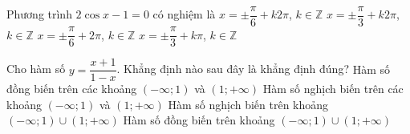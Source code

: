 \begin{ex}%
	Phương trình $2\cos x-1=0$ có nghiệm là
	\choice
	{$x=\pm \dfrac{\pi}{6}+k2\pi$, $k\in \mathbb{Z}$}
	{\True $x=\pm \dfrac{\pi}{3}+k2\pi$, $k\in \mathbb{Z}$}
	{$x=\pm \dfrac{\pi}{6}+2\pi$, $k\in \mathbb{Z}$}
	{$x=\pm \dfrac{\pi}{3}+k\pi$, $k\in \mathbb{Z}$}
\end{ex}

\begin{ex}%
	Cho hàm số $y=\dfrac{x+1}{1-x}$. Khẳng định nào sau đây là khẳng định đúng?
	\choice
	{\True Hàm số đồng biến trên các khoảng $\left(-\infty;1\right)$ và $\left(1;+\infty \right)$}
	{Hàm số nghịch biến trên các khoảng $\left(-\infty;1\right)$ và $\left(1;+\infty \right)$}
	{Hàm số nghịch biến trên khoảng $\left(-\infty;1\right)\cup \left(1;+\infty \right)$}
	{Hàm số đồng biến trên khoảng $\left(-\infty;1\right)\cup \left(1;+\infty \right)$}
\end{ex}

